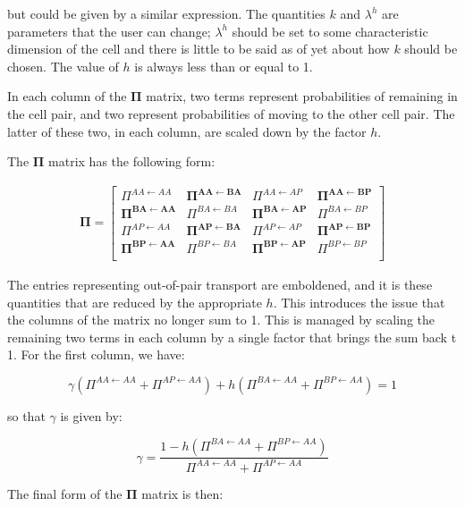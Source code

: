 \documentclass[letterpaper,12pt]{article}
\newcommand{\pito}[2]{\Pi^{#1 \gets #2}}
\begin{document}
\noindent but could be given by a similar expression. The quantities $k$
and $\lambda^h$ are parameters that the user can change; $\lambda^h$ should be
set to some characteristic dimension of the cell and there is little to be
said as of yet about how $k$ should be chosen. The value of $h$ is always less
than or equal to 1.

In each column of the $\mathbf{\Pi}$ matrix, two terms represent probabilities of
remaining in the cell pair, and two represent probabilities of moving to the
other cell pair. The latter of these two, in each column, are scaled down by
the factor $h$.

The $\mathbf{\Pi}$ matrix has the following form:

\begin{align}
    \mathbf{\Pi} = 
    \begin{bmatrix}
        \pito{AA}{AA} & \mathbf{\pito{AA}{BA}} & \pito{AA}{AP} &
        \mathbf{\pito{AA}{BP}} \\
        \mathbf{\pito{BA}{AA}} & \pito{BA}{BA} & \mathbf{\pito{BA}{AP}} & \pito{BA}{BP} \\
        \pito{AP}{AA} & \mathbf{\pito{AP}{BA}} & \pito{AP}{AP} &
        \mathbf{\pito{AP}{BP}} \\
        \mathbf{\pito{BP}{AA}} & \pito{BP}{BA} & \mathbf{\pito{BP}{AP}} & \pito{BP}{BP} \\
    \end{bmatrix}
\end{align}

The entries representing out-of-pair transport are emboldened, and it is these
quantities that are reduced by the appropriate $h$. This introduces the issue
that the columns of the matrix no longer sum to 1. This is managed by scaling the
remaining two terms in each column by a single factor that brings the sum back
t 1. For the first column, we have:

\begin{equation}
    \gamma (\pito{AA}{AA} + \pito{AP}{AA}) + h(\pito{BA}{AA} + \pito{BP}{AA}) =
    1
\end{equation}

so that $\gamma$ is given by:

\begin{equation}
    \gamma  = \frac{1 - h(\pito{BA}{AA} + \pito{BP}{AA})}{\pito{AA}{AA} +
    \pito{AP}{AA}}
\end{equation}

The final form of the $\mathbf{\Pi}$ matrix is then:
\end{document}
